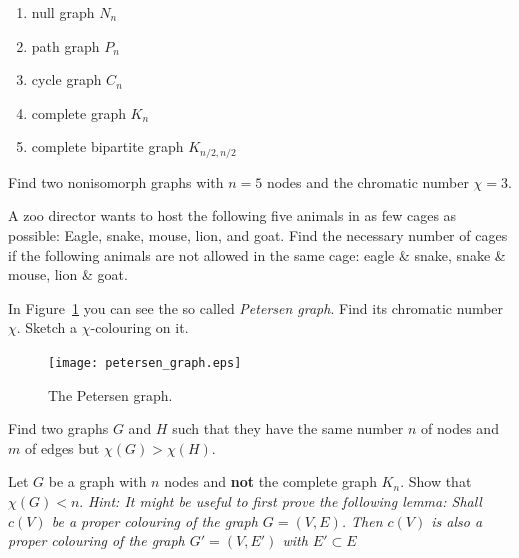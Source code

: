 \begin{enumerate}
\item null graph $N_n$
\item path graph $P_n$
\item cycle graph $C_n$
\item complete graph $K_n$
\item complete bipartite graph $K_{n/2,n/2}$
\end{enumerate}

\subexercise[%
  topic=Chromatic Number,
    ]
 
 Find two nonisomorph graphs with $n=5$ nodes and the chromatic number $\chi=3$.   
 

\subexercise[%
  topic=Zoo director,
    ]
  
  A zoo director wants to host the following five animals in as few
  cages as possible: Eagle, snake, mouse, lion, and goat. Find the
  necessary number of cages if the following animals are not allowed in
  the same cage: eagle \& snake, snake \& mouse, lion \& goat.
  

\subexercise[%
  topic=Petersen Graph,
    ]
    
In Figure~\ref{petersen} you can see the so called \emph{Petersen graph}. Find its chromatic number $\chi$. Sketch a  $\chi$-colouring on it.    
    
\begin{figure}[h]
    \centering
    \texttt{[image: petersen\_graph.eps]}
    \caption{\label{petersen} The Petersen graph.}

\end{figure}



\subexercise[%
  topic=Graphs of Different Size but Same Chromatic Number
    ]
		
	Find two graphs $G$ and $H$ such that they have the same number $n$ of nodes and $m$ of edges but $\chi (G)> \chi (H)$.



\subexercise[%
  topic=An upper bound for the chromatic number,
    ]
    
Let $G$ be a graph with $n$ nodes and {\bf not} the complete graph
$K_n$. Show that $\chi (G) < n$. \emph{Hint: It might be useful to first
    prove the following lemma: Shall $c(V)$ be a proper colouring of the graph $G=(V,E)$. 
    Then $c(V)$ is also a proper colouring of the graph $G'=(V,E')$ with $E'\subset E$ }
    


